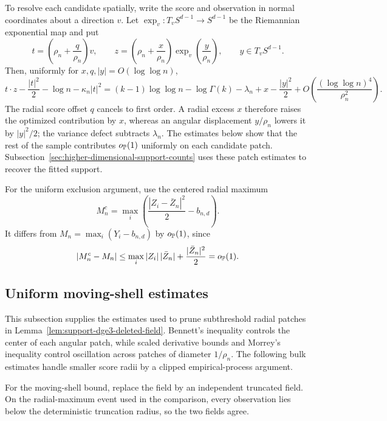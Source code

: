 To resolve each candidate spatially, write the score and observation in normal
coordinates about a direction \(v\). Let
\(\exp_v:T_vS^{d-1}\to S^{d-1}\) be the Riemannian exponential map and put
\[
    t=\left(\rho_n+\frac q{\rho_n}\right)v,\qquad
    z=\left(\rho_n+\frac x{\rho_n}\right)\exp_v\left(\frac y{\rho_n}\right),
    \qquad y\in T_vS^{d-1}.
\]
Then, uniformly for \(x,q,|y|=O(\log\log n)\),
\[
    t\cdot z-\frac{|t|^2}{2}-\log n-\kappa_n|t|^2
    =
    (k-1)\log\log n-\log\Gamma(k)-\lambda_n
    +x-\frac{|y|^2}{2}
    +
    O\!\left(\frac{(\log\log n)^4}{\rho_n^2}\right).
\]
The radial score offset \(q\) cancels to first order. A radial excess \(x\)
therefore raises the optimized contribution by \(x\), whereas an angular
displacement \(y/\rho_n\) lowers it by \(|y|^2/2\); the variance defect
subtracts \(\lambda_n\). The estimates below show that the rest of the sample
contributes \(o_{\mathbb P}(1)\) uniformly on each candidate patch.
Subsection~\ref{sec:higher-dimensional-support-counts} uses these patch
estimates to recover the fitted support.

For the uniform exclusion argument, use the centered radial maximum
\[
    M_n^c
    =
    \max_i\left(\frac{|Z_i-\bar Z_n|^2}{2}-b_{n,d}\right).
\]
It differs from \(M_n=\max_i(Y_i-b_{n,d})\) by \(o_{\mathbb P}(1)\), since
\[
    |M_n^c-M_n|
    \le
    \max_i|Z_i|\,|\bar Z_n|+\frac{|\bar Z_n|^2}{2}
    =
    o_{\mathbb P}(1).
\]

\subsection{Uniform moving-shell estimates}
\label{sec:sharp-high-dimensional-estimates}

This subsection supplies the estimates used to prune subthreshold radial
patches in Lemma~\ref{lem:support-dge3-deleted-field}. Bennett's inequality
controls the center of each angular patch, while scaled derivative bounds and
Morrey's inequality control oscillation across patches of diameter
\(1/\rho_n\). The following bulk estimates handle smaller score radii by a
clipped empirical-process argument.

For the moving-shell bound, replace the field by an independent truncated
field. On the radial-maximum event used in the comparison, every observation
lies below the deterministic truncation radius, so the two fields agree.

